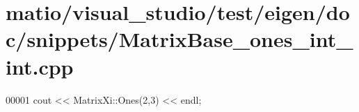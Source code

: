 \hypertarget{matio_2visual__studio_2test_2eigen_2doc_2snippets_2_matrix_base__ones__int__int_8cpp_source}{}\section{matio/visual\+\_\+studio/test/eigen/doc/snippets/\+Matrix\+Base\+\_\+ones\+\_\+int\+\_\+int.cpp}
\label{matio_2visual__studio_2test_2eigen_2doc_2snippets_2_matrix_base__ones__int__int_8cpp_source}

\begin{DoxyCode}
00001 cout << MatrixXi::Ones(2,3) << endl;
\end{DoxyCode}
